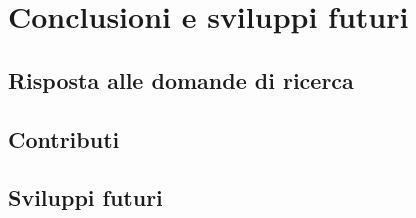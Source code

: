 \chapter{Conclusioni e sviluppi futuri}
\label{cap:conclusioni}

\section{Risposta alle domande di ricerca}
\label{sec:risposte-rq}

\section{Contributi}
\label{sec:contributi}

\section{Sviluppi futuri}
\label{sec:sviluppi-futuri}
